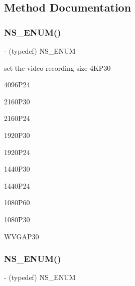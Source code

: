 \subsection{Method Documentation}
\mbox{\label{interface_p_v_camera_settings_def_a2e8190fc2ed2822c87d2a2de739ee3e3}} 
\subsubsection{\texorpdfstring{N\+S\+\_\+\+E\+N\+U\+M()}{NS\_ENUM()}\hspace{0.1cm}{\footnotesize\ttfamily [1/17]}}
{\footnotesize\ttfamily -\/ (typedef) N\+S\+\_\+\+E\+N\+UM \begin{DoxyParamCaption}\item[{(N\+S\+U\+Integer)}]{ }\item[{(P\+V\+Camera\+Video\+Size)}]{ }\end{DoxyParamCaption}}

set the video recording size 4\+K\+P30

4096\+P24

2160\+P30

2160\+P24

1920\+P30

1920\+P24

1440\+P30

1440\+P24

1080\+P60

1080\+P30

W\+V\+G\+A\+P30\mbox{\label{interface_p_v_camera_settings_def_afec0b438006ee00b12538e963376a740}} 
\subsubsection{\texorpdfstring{N\+S\+\_\+\+E\+N\+U\+M()}{NS\_ENUM()}\hspace{0.1cm}{\footnotesize\ttfamily [2/17]}}
{\footnotesize\ttfamily -\/ (typedef) N\+S\+\_\+\+E\+N\+UM \begin{DoxyParamCaption}\item[{(N\+S\+U\+Integer)}]{ }\item[{(P\+V\+Camera\+Video\+AF)}]{ }\end{DoxyParamCaption}}

